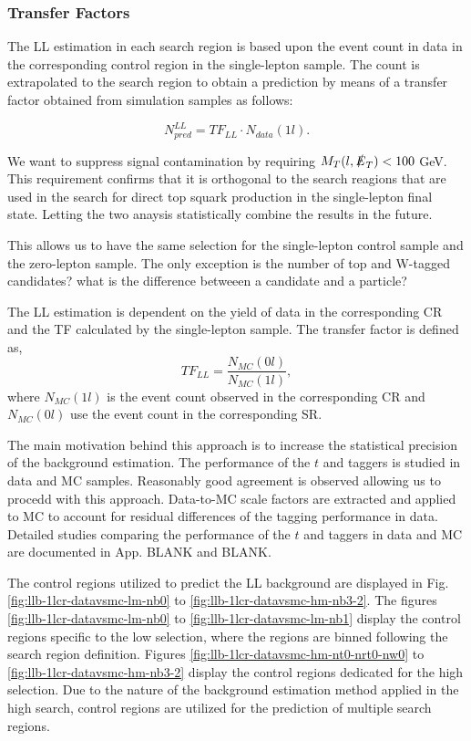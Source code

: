 \subsubsection{Transfer Factors}
\label{subsec:TF}

The LL estimation in each search region is based upon the event count in data in the corresponding control region in the single-lepton sample. The count is extrapolated to the search region to obtain a prediction by means of a transfer factor obtained from simulation samples as follows: 

\begin{equation}
\label{eqn:LLTF}
N_{pred}^{LL}=TF_{LL} \cdot N_{data}(1l).
\end{equation}

We want to suppress signal contamination by requiring $M_{T}(l, \slashed{E}_{T}) < 100$ GeV. This requirement confirms that it is orthogonal to the search reagions that are used in the search for direct top squark production in the single-lepton final state. Letting the two anaysis statistically combine the results in the future. 

This allows us to have the same selection for the single-lepton control sample and the zero-lepton sample. The only exception is the number of top and W-tagged candidates? what is the difference betweeen a candidate and a particle?

The LL estimation is dependent on the yield of data in the corresponding CR and the TF calculated by the single-lepton sample. The transfer factor is defined as, 
\begin{equation}
\label{eqn:TF}
TF_{LL}=\frac{N_{MC}(0l)}{N_{MC}(1l)},
\end{equation}
where $N_{MC}(1l)$ is the event count observed in the corresponding CR and $N_{MC}(0l)$ use the event count in the corresponding SR. 

The main motivation behind this approach is to increase the statistical precision of the background estimation. The performance of the $t$ and \W{} taggers is studied in data and MC samples. Reasonably good agreement is observed allowing us to procedd with this approach. Data-to-MC scale factors are extracted and applied to MC to account for residual differences of the tagging performance in data. Detailed studies comparing the performance of the $t$ and \W{} taggers in data and MC are documented in App. BLANK and BLANK.

The control regions utilized to predict the LL background are displayed in Fig. \ref{fig:llb-1lcr-datavsmc-lm-nb0} to \ref{fig:llb-1lcr-datavsmc-hm-nb3-2}. The figures \ref{fig:llb-1lcr-datavsmc-lm-nb0} to \ref{fig:llb-1lcr-datavsmc-lm-nb1} display the control regions specific to the low \dm{} selection, where the regions are binned following the search region definition. Figures \ref{fig:llb-1lcr-datavsmc-hm-nt0-nrt0-nw0} to \ref{fig:llb-1lcr-datavsmc-hm-nb3-2} display the control regions dedicated for the high \dm{} selection. Due to the nature of the background estimation method applied in the high \dm{} search, control regions are utilized for the prediction of multiple search regions. 

